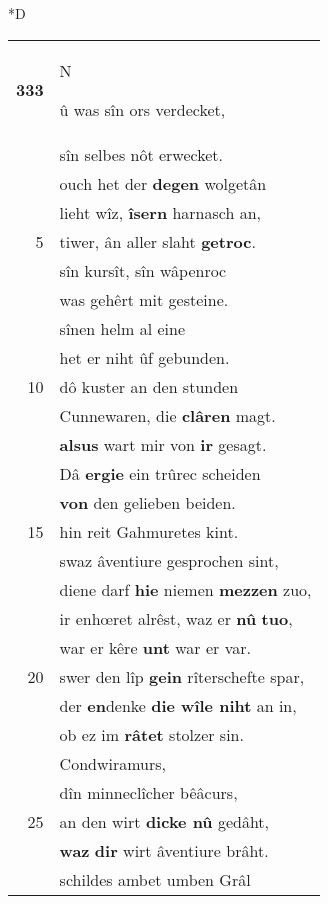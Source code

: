 \documentclass[8pt,a4paper,notitlepage]{article}
\begin{document}
\begin{table}[ht]
\begin{minipage}[t]{0.5\linewidth}
\small
\begin{center}*D
\end{center}
\begin{tabular}{rl}
\textbf{333} & \begin{large}N\end{large}û was sîn ors verdecket,\\ 
 & sîn selbes nôt erwecket.\\ 
 & ouch het der \textbf{degen} wolgetân\\ 
 & lieht wîz, \textbf{îsern} harnasch an,\\ 
5 & tiwer, ân aller slaht \textbf{getroc}.\\ 
 & sîn kursît, sîn wâpenroc\\ 
 & was gehêrt mit gesteine.\\ 
 & sînen helm al eine\\ 
 & het er niht ûf gebunden.\\ 
10 & dô kuster an den stunden\\ 
 & Cunnewaren, die \textbf{clâren} magt.\\ 
 & \textbf{alsus} wart mir von \textbf{ir} gesagt.\\ 
 & Dâ \textbf{ergie} ein trûrec scheiden\\ 
 & \textbf{von} den gelieben beiden.\\ 
15 & hin reit Gahmuretes kint.\\ 
 & swaz âventiure gesprochen sint,\\ 
 & diene darf \textbf{hie} niemen \textbf{mezzen} zuo,\\ 
 & ir enhœret alrêst, waz er \textbf{nû} \textbf{tuo},\\ 
 & war er kêre \textbf{unt} war er var.\\ 
20 & swer den lîp \textbf{gein} rîterschefte spar,\\ 
 & der \textbf{en}denke \textbf{die wîle niht} an in,\\ 
 & ob ez im \textbf{râtet} stolzer sin.\\ 
 & Condwiramurs,\\ 
 & dîn minneclîcher bêâcurs,\\ 
25 & an den wirt \textbf{dicke nû} gedâht,\\ 
 & \textbf{waz} \textbf{dir} wirt âventiure brâht.\\ 
 & schildes ambet umben Grâl\\ 

\end{tabular}
\end{minipage}
\end{table}
\end{document}
